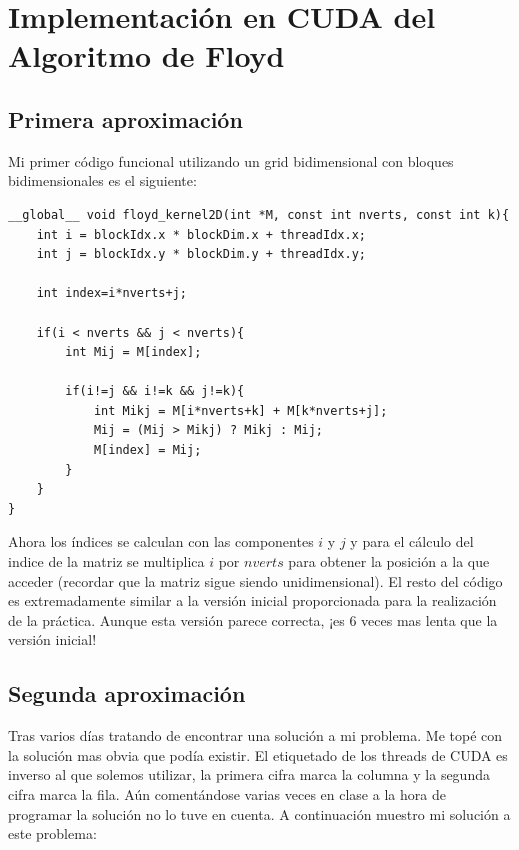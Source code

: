  
\maketitle
\newpage

\section{Implementación en CUDA del Algoritmo de Floyd}
\subsection{Primera aproximación}
Mi primer código funcional utilizando un grid bidimensional con bloques bidimensionales es el siguiente:

\begin{verbatim}
__global__ void floyd_kernel2D(int *M, const int nverts, const int k){
	int i = blockIdx.x * blockDim.x + threadIdx.x;
	int j = blockIdx.y * blockDim.y + threadIdx.y;
	
	int index=i*nverts+j;
	
	if(i < nverts && j < nverts){
		int Mij = M[index];
		
		if(i!=j && i!=k && j!=k){
			int Mikj = M[i*nverts+k] + M[k*nverts+j];
			Mij = (Mij > Mikj) ? Mikj : Mij;
			M[index] = Mij;
		}
	}
}
\end{verbatim}

Ahora los índices se calculan con las componentes $i$ y $j$ y para el cálculo del indice de la matriz se multiplica $i$ por $nverts$ para obtener la posición a la que acceder (recordar que la matriz sigue siendo unidimensional). El resto del código es extremadamente similar a la versión inicial proporcionada para la realización de la práctica. Aunque esta versión parece correcta, ¡es 6 veces mas lenta que la versión inicial!

\subsection{Segunda aproximación}
Tras varios días tratando de encontrar una solución a mi problema. Me topé con la solución mas obvia que podía existir. El etiquetado de los threads de CUDA es inverso al que solemos utilizar, la primera cifra marca la columna y la segunda cifra marca la fila. Aún comentándose varias veces en clase a la hora de programar la solución no lo tuve en cuenta.
A continuación muestro mi solución a este problema:

